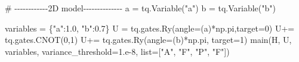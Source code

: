 \documentclass[
  letterpaper,
  DIV=11,
  numbers=noendperiod]{scrartcl}
\newenvironment{Shaded}{\begin{snugshade}}{\end{snugshade}}
\newcommand{\BuiltInTok}[1]{\textcolor[rgb]{0.00,0.23,0.31}{#1}}
\newcommand{\CommentTok}[1]{\textcolor[rgb]{0.37,0.37,0.37}{#1}}
\newcommand{\DecValTok}[1]{\textcolor[rgb]{0.68,0.00,0.00}{#1}}
\newcommand{\FloatTok}[1]{\textcolor[rgb]{0.68,0.00,0.00}{#1}}
\newcommand{\NormalTok}[1]{\textcolor[rgb]{0.00,0.23,0.31}{#1}}
\newcommand{\OperatorTok}[1]{\textcolor[rgb]{0.37,0.37,0.37}{#1}}
\newcommand{\StringTok}[1]{\textcolor[rgb]{0.13,0.47,0.30}{#1}}
\begin{document}
\begin{Shaded}
\begin{Highlighting}[]
\CommentTok{\# {-}{-}{-}{-}{-}{-}{-}{-}{-}{-}{-}{-}2D model{-}{-}{-}{-}{-}{-}{-}{-}{-}{-}{-}{-}{-}{-}}
\NormalTok{a }\OperatorTok{=}\NormalTok{ tq.Variable(}\StringTok{"a"}\NormalTok{)}
\NormalTok{b }\OperatorTok{=}\NormalTok{ tq.Variable(}\StringTok{"b"}\NormalTok{)}

\NormalTok{variables }\OperatorTok{=}\NormalTok{ \{}\StringTok{"a"}\NormalTok{:}\FloatTok{1.0}\NormalTok{, }\StringTok{"b"}\NormalTok{:}\FloatTok{0.7}\NormalTok{\}}
\NormalTok{U }\OperatorTok{=}\NormalTok{ tq.gates.Ry(angle}\OperatorTok{=}\NormalTok{(a)}\OperatorTok{*}\NormalTok{np.pi,target}\OperatorTok{=}\DecValTok{0}\NormalTok{)}
\NormalTok{U}\OperatorTok{+=}\NormalTok{ tq.gates.CNOT(}\DecValTok{0}\NormalTok{,}\DecValTok{1}\NormalTok{)}
\NormalTok{U}\OperatorTok{+=}\NormalTok{ tq.gates.Ry(angle}\OperatorTok{=}\NormalTok{(b)}\OperatorTok{*}\NormalTok{np.pi, target}\OperatorTok{=}\DecValTok{1}\NormalTok{)}
\NormalTok{main(H, U, variables, variance\_threshold}\OperatorTok{=}\FloatTok{1.e{-}8}\NormalTok{, }\BuiltInTok{list}\OperatorTok{=}\NormalTok{[}\StringTok{"A"}\NormalTok{, }\StringTok{"F"}\NormalTok{, }\StringTok{"P"}\NormalTok{, }\StringTok{"F"}\NormalTok{])}
\end{Highlighting}
\end{Shaded}
\end{document}
